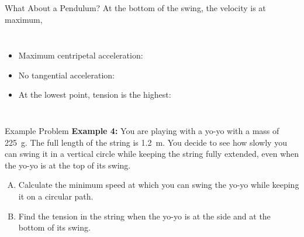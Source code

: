 \documentclass[12pt,compress,aspectratio=169]{beamer}
\newcommand{\mb}[1]{\ensuremath\mathbf{#1}}
\newcommand{\eq}[2]{\vspace{#1}{\Large\begin{displaymath}#2\end{displaymath}}}
\begin{document}
\begin{frame}{What About a Pendulum?}
  At the bottom of the swing, the velocity is at maximum,
  
  \vspace{.1in}\begin{columns}

    \begin{itemize}
    \item Maximum centripetal acceleration:

      \eq{-.25in}{
        a_r=\frac{v^2}{r}
      }
    \item No tangential acceleration:

      \eq{-.25in}{
        a_\theta=0
      }
    \item At the lowest point, tension is the highest:

      \eq{-.3in}{
        T=w+F_r=m\left(g+\frac{v^2}{r}\right)
      }
    \end{itemize}
  \end{columns}
\end{frame}



\begin{frame}{Example Problem}
  \textbf{Example 4:} You are playing with a yo-yo with a mass of
  \SI{225}{\gram}. The full length of the string is \SI{1.2}{\metre}. You
  decide to see how slowly you can swing it in a vertical circle while keeping
  the string fully extended, even when the yo-yo is at the top of its swing.
  \begin{enumerate}[A.]
  \item Calculate the minimum speed at which you can swing the yo-yo while
    keeping it on a circular path.
  \item Find the tension in the string when the yo-yo is at the side and at the
    bottom of its swing. 
  \end{enumerate}
\end{frame}
\end{document}

